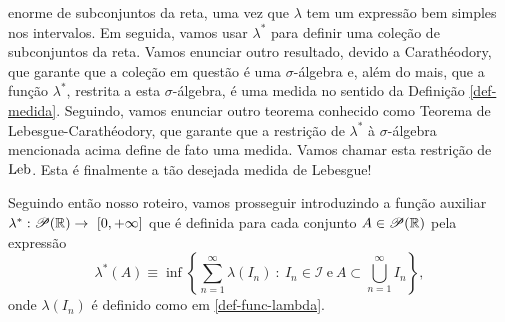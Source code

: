         enorme de subconjuntos da reta, uma vez que $\lambda$ tem um expressão bem simples nos intervalos. 
        Em seguida, vamos usar $\lambda^{*}$ para definir uma coleção 
        de subconjuntos da reta. Vamos enunciar outro resultado, 
        devido a Carathéodory, que garante que a coleção em questão é uma $\sigma$-álgebra
        e, além do mais, que a função $\lambda^{*}$, 
        restrita a esta $\sigma$-álgebra, é uma medida no sentido da Definição 
        \ref{def-medida}. 
        Seguindo, vamos enunciar outro teorema 
        conhecido como Teorema de Lebesgue-Carathéodory,
        que garante que a restrição de $\lambda^*$ à $\sigma$-álgebra 
        mencionada acima define de fato uma medida. 
        Vamos chamar esta restrição de $\mathrm{Leb}$. 
        Esta é finalmente a tão desejada medida de Lebesgue! 
        
        \bigskip
        
        Seguindo então nosso roteiro, vamos prosseguir introduzindo a função auxiliar
        $\lambda^*:\mathscr{P}(\R)\to\ [0,+\infty]$ que é definida
        para cada conjunto $A\in \mathscr{P}(\mathbb{R})$ pela expressão
        \begin{equation}
        \label{def-func-lambda-star}
            \lambda^{*}(A)
            \equiv
            \inf
            \left\{
                \sum_{n=1}^{\infty} 
                \lambda(I_n) \ : \ 
                I_n\in \mathcal{I} 
                \ \textrm{e} \ 
                A\subset \bigcup_{n=1}^{\infty} I_n
            \right\},
        \end{equation}
        onde $\lambda(I_n)$ é definido como em \eqref{def-func-lambda}. 
        
